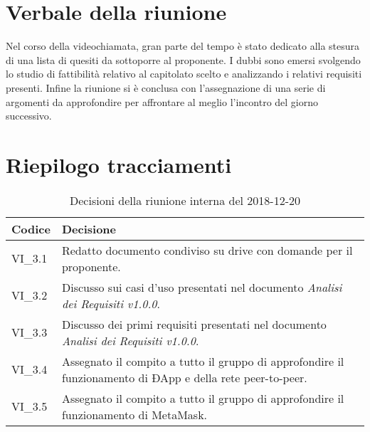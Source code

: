 \section{Verbale della riunione}
Nel corso della videochiamata, gran parte del tempo è stato dedicato alla 
stesura di una lista di quesiti da sottoporre al proponente. I dubbi sono emersi
svolgendo lo studio di fattibilità relativo al capitolato scelto e analizzando i
relativi requisiti presenti.
Infine la riunione si è conclusa con l'assegnazione di una serie di argomenti 
da approfondire per affrontare al meglio l'incontro del giorno 
successivo.
\pagebreak
\section{Riepilogo tracciamenti}

	\begin{longtable}{ >{\centering}p{} >{}p{}}
		\caption{Decisioni della riunione interna del 2018-12-20}\\	
		\rowcolorhead
		\textbf{\color{white}Codice} 
		& \centering\textbf{\color{white}Decisione} 
		\tabularnewline 
		\endfirsthead
		VI\_3.1 & Redatto documento condiviso su drive con domande per il proponente.
		
		\tabularnewline 
		VI\_3.2 & Discusso sui casi d'uso presentati nel documento \textit{Analisi dei 
					Requisiti v1.0.0}.
		
		\tabularnewline 
		VI\_3.3 & Discusso dei primi requisiti presentati nel documento \textit{Analisi dei 
					Requisiti v1.0.0}.
	
		\tabularnewline 
		VI\_3.4 & Assegnato il compito a tutto il gruppo di approfondire il funzionamento
					di ÐApp\glo{} e della rete peer-to-peer.
		
		\tabularnewline
		VI\_3.5 & Assegnato il compito a tutto il gruppo di approfondire il funzionamento
					di MetaMask\glo{}.
					
	
	\end{longtable}


